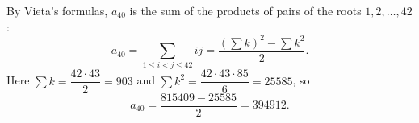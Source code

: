 By Vieta's formulas, $a_{40}$ is the sum of the products of pairs of the roots $1,2,\dots,42$:
\[a_{40}=\sum_{1\le i<j\le42}ij=\dfrac{\left(\sum k\right)^2-\sum k^2}{2}.\]
Here $\sum k=\dfrac{42\cdot43}{2}=903$ and $\sum k^2=\dfrac{42\cdot43\cdot85}{6}=25585$, so
\[a_{40}=\dfrac{815409-25585}{2}=\boxed{394912}.\]
